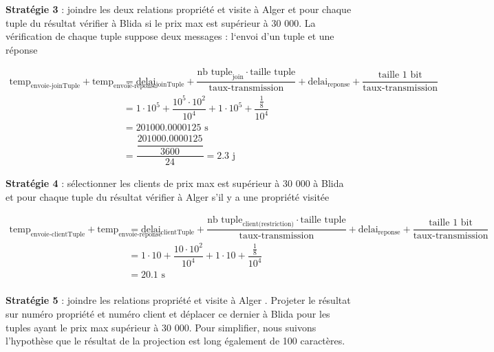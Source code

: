 \documentclass{article}
\begin{document}
\vspace{0.35cm}
\textbf{Stratégie 3} : joindre les deux relations propriété et visite à Alger et pour
chaque tuple du résultat vérifier à Blida si le prix max est supérieur à
30 000. La vérification de chaque tuple suppose deux messages : l‘envoi
d’un tuple et une réponse

\small 
\begin{align*}
    \text{temp}_{\text{envoie-joinTuple}} + \text{temp}_{\text{envoie-reponse}}  &= \text{delai}_{\text{joinTuple}} + \dfrac{\text{nb tuple}_{\text{join}} \cdot \text{taille tuple}}{\text{taux-transmission}} + \text{delai}_{\text{reponse}} + \dfrac{\text{taille 1 bit}}{\text{taux-transmission}}\\[0.15cm]
                                                                                 &= 1\cdot 10^5 + \dfrac{10^5 \cdot 10^2}{10^4} + 1 \cdot 10^5 + \dfrac{\frac{1}{8}}{10^4}  \\[0.15cm]
                                   &= 201000.0000125\text{ s}\\[0.15cm]
                                   &= \dfrac{\dfrac{201000.0000125}{3600}}{24} = 2.3 \text{ j}
\end{align*}

\vspace{0.35cm}
\textbf{Stratégie 4} : sélectionner les clients de prix max est supérieur à 30 000 à
Blida et pour chaque tuple du résultat vérifier à Alger s’il y a une propriété
visitée

\small 
\begin{align*}
    \text{temp}_{\text{envoie-clientTuple}} + \text{temp}_{\text{envoie-reponse}}  &= \text{delai}_{\text{clientTuple}} + \dfrac{\text{nb tuple}_{\text{client(restriction)}} \cdot \text{taille tuple}}{\text{taux-transmission}} + \text{delai}_{\text{reponse}} + \dfrac{\text{taille 1 bit}}{\text{taux-transmission}}\\[0.15cm]
                                                                                 &= 1\cdot 10 + \dfrac{10 \cdot 10^2}{10^4} + 1 \cdot 10 + \dfrac{\frac{1}{8}}{10^4}  \\[0.15cm]
                                   &= 20.1\text{ s}\\[0.15cm]
\end{align*}

\newpage
\textbf{Stratégie 5} : joindre les relations propriété et visite à Alger . Projeter le
résultat sur numéro propriété et numéro client et déplacer ce dernier à
Blida pour les tuples ayant le prix max supérieur à 30 000. Pour simplifier,
nous suivons l’hypothèse que le résultat de la projection est long également
de 100 caractères.
\end{document}
